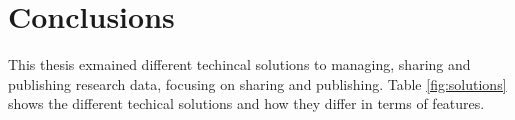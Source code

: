 \chapter{Conclusions}
\label{chapter:conclusions}

This thesis exmained different techincal solutions to managing, sharing and
publishing research data, focusing on sharing and publishing. Table
\ref{fig:solutions} shows the different techical solutions and how they
differ in terms of features.

